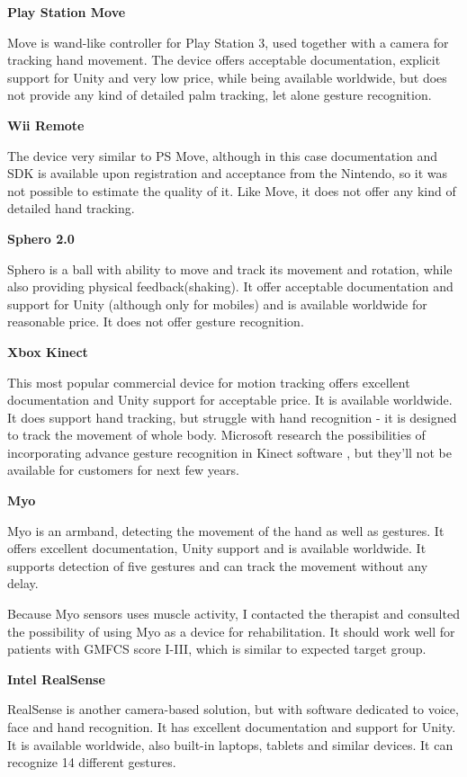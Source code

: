 \documentclass[10pt,a4paper]{article}
\begin{document}
\textbf{Play Station Move}

Move is wand-like controller for Play Station 3, used together with a camera for tracking hand movement. The device offers acceptable documentation, explicit support for Unity and very low price, while being available worldwide, but does not provide any kind of detailed palm tracking, let alone gesture recognition. 

\textbf{Wii Remote}

The device very similar to PS Move, although in this case documentation and SDK is available upon registration and acceptance from the Nintendo, so it was not possible to estimate the quality of it. Like Move, it does not offer any kind of detailed hand tracking.

\textbf{Sphero 2.0}

Sphero is a ball with ability to move and track its movement and rotation, while also providing physical feedback(shaking). It offer acceptable documentation and support for Unity (although only for mobiles) and is available worldwide for reasonable price. It does not offer gesture recognition.

\textbf{Xbox Kinect}

This most popular commercial device for motion tracking offers excellent documentation and Unity support for acceptable price. It is available worldwide. It does support hand tracking, but struggle with hand recognition - it is designed to track the movement of whole body. Microsoft research the possibilities of incorporating advance gesture recognition in Kinect software \cite{handpose}, but they'll not be available for customers for next few years. 

\textbf{Myo}

Myo is an armband, detecting the movement of the hand as well as gestures. It offers excellent documentation, Unity support and is available worldwide. It supports detection of five gestures and can track the movement without any delay. 

Because Myo sensors uses muscle activity, I contacted the therapist and consulted the possibility of using Myo as a device for rehabilitation. It should work well for patients with GMFCS score I-III, which is similar to expected target group.

\textbf{Intel RealSense}

RealSense is another camera-based solution, but with software dedicated to voice, face and hand recognition. It has excellent documentation and support for Unity. It is available worldwide, also built-in laptops, tablets and similar devices. It can recognize 14 different gestures.
\end{document}
